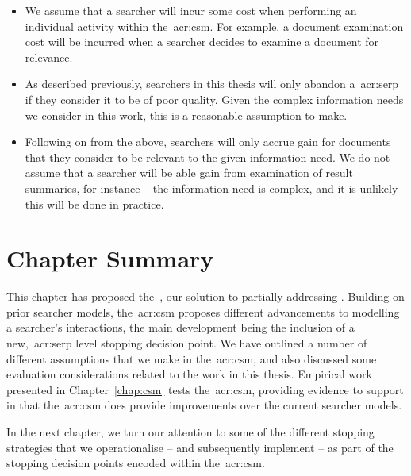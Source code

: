 \begin{itemize}
    \item{ We assume that a searcher will incur some cost when performing an individual activity within the~\gls{acr:csm}. For example, a document examination cost will be incurred when a searcher decides to examine a document for relevance.}
    \item{ As described previously, searchers in this thesis will only abandon a~\gls{acr:serp} if they consider it to be of poor quality. Given the complex information needs we consider in this work, this is a reasonable assumption to make.}
    \item{ Following on from the above, searchers will only accrue gain for documents that they consider to be relevant to the given information need. We do not assume that a searcher will be able gain from examination of result summaries, for instance -- the information need is complex, and it is unlikely this will be done in practice.}
\end{itemize}

\section{Chapter Summary}
This chapter has proposed the~, our solution to partially addressing . Building on prior searcher models, the~\gls{acr:csm} proposes different advancements to modelling a searcher's interactions, the main development being the inclusion of a new,~\gls{acr:serp} level stopping decision point. We have outlined a number of different assumptions that we make in the~\gls{acr:csm}, and also discussed some evaluation considerations related to the work in this thesis. Empirical work presented in Chapter~\ref{chap:csm} tests the~\gls{acr:csm}, providing evidence to support  in that the~\gls{acr:csm} does provide improvements over the current searcher models.

In the next chapter, we turn our attention to some of the different stopping strategies that we operationalise -- and subsequently implement -- as part of the stopping decision points encoded within the~\gls{acr:csm}.